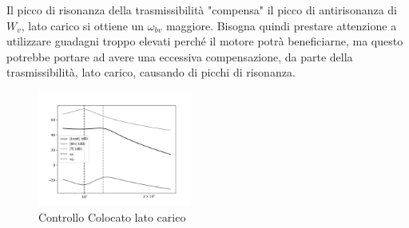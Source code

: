 Il picco di risonanza della trasmissibilità "compensa" il picco di antirisonanza di \(W_v\), lato carico si ottiene un \(\omega_{bv}\) maggiore.
Bisogna quindi prestare attenzione a utilizzare guadagni troppo elevati perché il motore potrà beneficiarne, ma questo potrebbe portare ad avere una eccessiva compensazione, da parte della trasmissibilità, lato carico, causando di picchi di risonanza.

\begin{figure}[h]
    \centering
    \includegraphics[width=0.45\textwidth]{Immagini/colocato_v_lato_carico.png}
    \caption{Controllo Colocato lato carico}
\end{figure}



